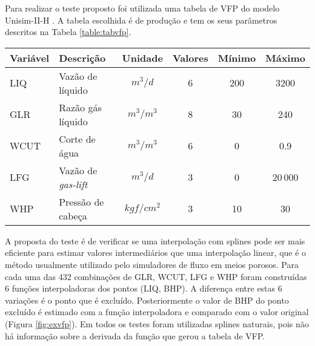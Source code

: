 \documentclass[final,5p]{elsarticle}
\numberwithin{equation}{section}
\begin{document}
        Para realizar o teste proposto foi utilizada uma tabela de VFP do modelo Unisim-II-H \cite{maschio2018case}. A tabela escolhida é de produção e tem os seus parâmetros descritos na Tabela \ref{table:tabvfp}.

        \begin{table*} 
            \caption{Parâmetros da tabela de VFP utilizada nas comparações. O parâmetro principal (BHP) é em $kgf/cm^2$.}
            \label{table:tabvfp}
            \begin{tabular}{ l l c c c c }
                \hline
                Variável & Descrição & Unidade & Valores & Mínimo & Máximo \\ 
                \hline
                LIQ  & Vazão de líquido         & $m^3/d$    & 6 & 200 &   3200 \\
                GLR  & Razão gás líquido        & $m^3/m^3$  & 8 & 30  &    240 \\
                WCUT & Corte de água            & $m^3/m^3$  & 6 &  0  &    0.9 \\
                LFG  & Vazão de \emph{gas-lift} & $m^3/d$    & 3 &  0  &  20$\,$000 \\
                WHP  & Pressão de cabeça        & $kgf/cm^2$ & 3 & 10  &     30 \\
                \hline
            \end{tabular}
        \end{table*}

        A proposta do teste é de verificar se uma interpolação com splines pode ser mais eficiente para estimar valores intermediários que uma interpolação linear, que é o método usualmente utilizado pelo simuladores de fluxo em meios porosos. Para cada uma das 432 combinações de GLR, WCUT, LFG e WHP foram construídas 6 funções interpoladoras dos pontos (LIQ, BHP). A diferença entre estas 6 variações é o ponto que é excluído. Posteriormente o valor de BHP do ponto excluído é estimado com a função interpoladora e comparado com o valor original (Figura \ref{fig:exvfp}). Em todos os testes foram utilizadas splines naturais, pois não há informação sobre a derivada da função que gerou a tabela de VFP. 
\end{document}
